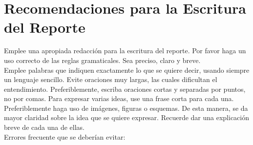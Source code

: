 \section*{Recomendaciones para la Escritura del Reporte}

Emplee una apropiada redacción para la escritura del reporte. Por favor haga un uso correcto de las reglas gramaticales. Sea preciso, claro y breve. \\

Emplee palabras que indiquen exactamente lo que se quiere decir, usando siempre un lenguaje sencillo. Evite oraciones muy largas, las cuales dificultan el entendimiento. Preferiblemente, escriba oraciones cortas y separadas por puntos, no por comas. Para expresar varias ideas, use una frase corta para cada una. \\

Preferiblemente haga uso de imágenes, figuras o esquemas. De esta manera, se da mayor claridad sobre la idea que se quiere expresar. Recuerde dar una explicación breve de cada una de ellas. \\

Errores frecuente que se deberían evitar:\\

